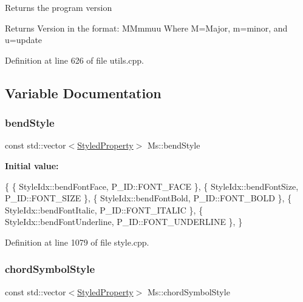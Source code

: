 Returns the program version

\begin{DoxyReturn}{Returns}
Version in the format\+: M\+Mmmuu Where M=Major, m=minor, and u=update 
\end{DoxyReturn}


Definition at line 626 of file utils.\+cpp.



\subsection{Variable Documentation}
\mbox{\label{namespace_ms_abb29fd67f74a9e3e047de1122ae076de}} 
\subsubsection{\texorpdfstring{bend\+Style}{bendStyle}}
{\footnotesize\ttfamily const std\+::vector$<$\hyperlink{struct_ms_1_1_styled_property}{Styled\+Property}$>$ Ms\+::bend\+Style}

{\bfseries Initial value\+:}
\begin{DoxyCode}
\{
      \{ StyleIdx::bendFontFace,                       P\_ID::FONT\_FACE              \},
      \{ StyleIdx::bendFontSize,                       P\_ID::FONT\_SIZE              \},
      \{ StyleIdx::bendFontBold,                       P\_ID::FONT\_BOLD              \},
      \{ StyleIdx::bendFontItalic,                     P\_ID::FONT\_ITALIC            \},
      \{ StyleIdx::bendFontUnderline,                  P\_ID::FONT\_UNDERLINE         \},
      \}
\end{DoxyCode}


Definition at line 1079 of file style.\+cpp.

\mbox{\label{namespace_ms_a1d7621f91b9f9fbabbbfe71b88ecac2d}} 
\subsubsection{\texorpdfstring{chord\+Symbol\+Style}{chordSymbolStyle}}
{\footnotesize\ttfamily const std\+::vector$<$\hyperlink{struct_ms_1_1_styled_property}{Styled\+Property}$>$ Ms\+::chord\+Symbol\+Style}

